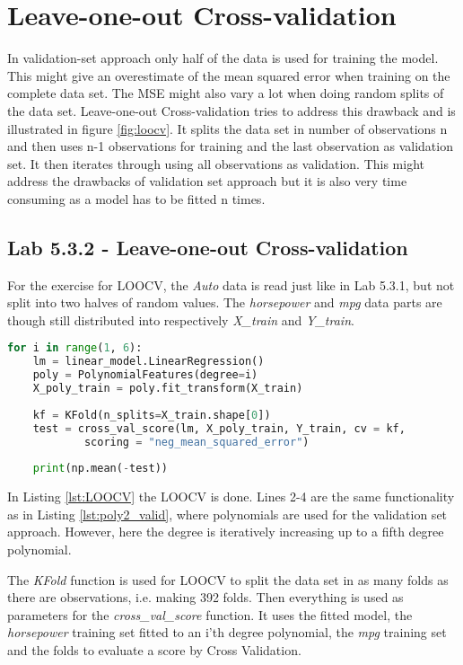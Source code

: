\section{Leave-one-out Cross-validation}
In validation-set approach only half of the data is used for training the model. This might give an overestimate of the mean squared error when training on the complete data set. The MSE might also vary a lot when doing random splits of the  data set. Leave-one-out Cross-validation tries to address this drawback and is illustrated in figure \ref{fig:loocv}. It splits the  data set in number of observations n and then uses n-1 observations for training and the last observation as validation set. It then iterates through using all observations as validation. This might address the drawbacks of validation set approach but it is also very time consuming as a model has to be fitted n times.


\subsection{Lab 5.3.2 - Leave-one-out Cross-validation}
For the exercise for LOOCV, the \emph{Auto} data is read just like in Lab 5.3.1, but not split into two halves of random values. The \emph{horsepower} and \emph{mpg} data parts are though still distributed into respectively \emph{X\_train} and \emph{Y\_train}. 

\begin{lstlisting}[language=Python, label=lst:LOOCV, caption=Leave-one-out Cross-validation loop]
for i in range(1, 6):
	lm = linear_model.LinearRegression()
	poly = PolynomialFeatures(degree=i)
	X_poly_train = poly.fit_transform(X_train)
	
	kf = KFold(n_splits=X_train.shape[0]) 
	test = cross_val_score(lm, X_poly_train, Y_train, cv = kf, 
			scoring = "neg_mean_squared_error")
	
	print(np.mean(-test))
\end{lstlisting}

In Listing \ref{lst:LOOCV} the LOOCV is done. Lines 2-4 are the same functionality as in Listing \ref{lst:poly2_valid}, where polynomials are used for the validation set approach. However, here the degree is iteratively increasing up to a fifth degree polynomial.

The \emph{KFold} function is used for LOOCV to split the data set in as many folds as there are observations, i.e. making 392 folds. Then everything is used as parameters for the \emph{cross\_val\_score} function. It uses the fitted model, the \emph{horsepower} training set fitted to an i'th degree polynomial, the \emph{mpg} training set and the folds to evaluate a score by Cross Validation.

